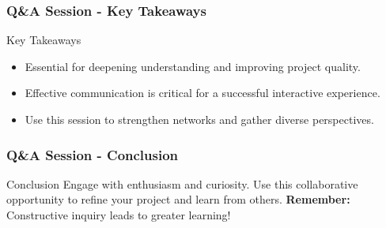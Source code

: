\documentclass[aspectratio=169]{beamer}
\begin{document}
\begin{frame}[fragile]
    \frametitle{Q\&A Session - Key Takeaways}
    \begin{block}{Key Takeaways}
        \begin{itemize}
            \item Essential for deepening understanding and improving project quality.
            \item Effective communication is critical for a successful interactive experience.
            \item Use this session to strengthen networks and gather diverse perspectives.
        \end{itemize}
    \end{block}
\end{frame}

\begin{frame}[fragile]
    \frametitle{Q\&A Session - Conclusion}
    \begin{block}{Conclusion}
        Engage with enthusiasm and curiosity. 
        Use this collaborative opportunity to refine your project and learn from others.
        \textbf{Remember:} Constructive inquiry leads to greater learning!
    \end{block}
\end{frame}
\end{document}
